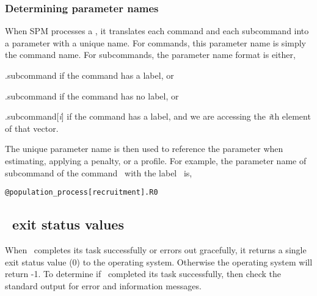 \subsubsection{Determining parameter names}

When SPM processes a \config, it translates each command and each subcommand into a parameter with a unique name. For commands, this parameter name is simply the command name. For subcommands, the parameter name format is either, 

\begin{description}
\item {}.subcommand if the command has a label, or
\item {}.subcommand if the command has no label, or
\item {}.subcommand[\emph{i}] if the command has a label, and we are accessing the \emph{i}th element of that vector.
\end{description} 

The unique parameter name is then used to reference the parameter when estimating, applying a penalty, or a profile. For example, the parameter name of subcommand  of the command \ with the label \ is,

\texttt{@population\_process[recruitment].R0}

\subsection{\SPM\ exit status values}

When \SPM\ completes its task successfully or errors out gracefully, it returns a single exit status value (0) to the operating system. Otherwise the operating system will return -1. To determine if \SPM\ completed its task successfully, then check the standard output for error and information messages.

